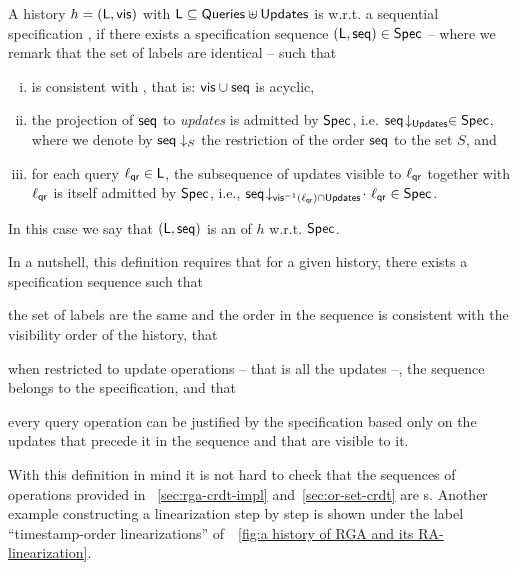 \begin{definition}
  \label{definition:ralinearizability1} A history $h =
  (\mathsf{L},\mathsf{vis})$ with $\mathsf{L}\subseteq \mathsf{Queries}\uplus\mathsf{Updates}$ is \crdtlinearizable{} w.r.t. a
   sequential specification
  \Spec{}, if there exists a specification sequence
  $(\mathsf{L}, \mathsf{seq}) \in \mathsf{Spec}{}$ -- where we remark that the set of labels
  are identical -- such that %
  \begin{enumerate}[(i)]
  \item \aseqord{} is consistent with  \avisord{}, that is: $\mathsf{vis}
    \cup \mathsf{seq}$ is acyclic,
  \item the projection of $\mathsf{seq}$ to \emph{updates} is
    admitted by $\mathsf{Spec}$, i.e.
    $\mathsf{seq}\!\downarrow_{\mathsf{Updates}} \in \mathsf{Spec}$, where we denote by
    $\mathsf{seq}\downarrow_{S}$ the restriction of the order $\mathsf{seq}$ to
    the set $S$, and
  \item\label{it:query} for each query $\ell_{\mathsf{qr}}\in \mathsf{L}$, the subsequence of updates visible to $\ell_{\mathsf{qr}}$ together with $\ell_{\mathsf{qr}}$ is itself admitted by $\mathsf{Spec}$, i.e., $\mathsf{seq}\!\downarrow_{\mathsf{vis}^{-1}(\ell_{\mathsf{qr}})\cap \mathsf{Updates}}\!\cdot\
    \ell_{\mathsf{qr}} \in \mathsf{Spec}$.
\end{enumerate}
In this case we say that $(\mathsf{L}, \mathsf{seq})$ is an \emph{\crdtlinearization{}} of $h$ w.r.t. $\mathsf{Spec}{}$.
\end{definition}

In a nutshell, this definition requires that for a given
history, there exists a specification sequence such
that
\begin{inparaenum}[(i)]
\item the set of labels are the same and the order in the sequence is
  consistent with the visibility order of the history, that
\item when restricted to update operations -- that is all the updates --, the sequence belongs to
  the specification, and that
\item every query operation can be justified by the specification based only
  on the updates that precede it in the sequence and that are visible
  to it.
\end{inparaenum}

With this definition in mind it is not hard to check that the
sequences of operations provided in
\sectionautorefname~\ref{sec:rga-crdt-impl} and~\ref{sec:or-set-crdt}
are \crdtlinearization{}s. 
%
Another example constructing a linearization step by step is shown
under the label ``timestamp-order linearizations''
of~\figureautorefname~\ref{fig:a history of RGA and its
  RA-linearization}.

